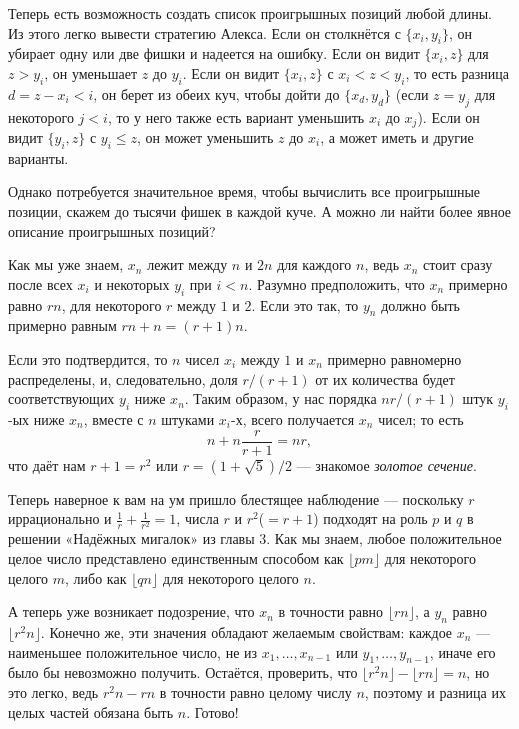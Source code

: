 Теперь есть возможность создать список проигрышных позиций любой длины.
Из этого легко вывести стратегию Алекса.
Если он столкнётся с $\{x_i , y_i\}$, он убирает одну или две фишки и надеется на ошибку.
Если он видит $\{x_i , z\}$ для $z > y_i$, он уменьшает $z$ до $y_i$.
Если он видит $\{x_i , z\}$ с $x_i < z < y_i$, то есть разница $d = z - x_i < i$, он берет из обеих куч, чтобы дойти до $\{x_d , y_d\}$ (если $z = y_j$ для некоторого $j < i$, то у него также есть вариант уменьшить $x_i$ до $x_j$).
Если он видит $\{y_i , z\}$ с $y_i \le z$, он может уменьшить $z$ до $x_i$, а может иметь и другие варианты.

Однако потребуется значительное время, чтобы вычислить все проигрышные позиции, скажем до тысячи фишек в каждой куче.
А можно ли найти более явное описание проигрышных позиций?

Как мы уже знаем, $x_n$ лежит между $n$ и $2n$ для каждого $n$, ведь $x_n$ стоит сразу после всех $x_i$ и некоторых $y_i$ при $i < n$.
Разумно предположить, что $x_n$ примерно равно $rn$, для некоторого $r$ между $1$ и $2$.
Если это так, то $y_n$ должно быть примерно равным $rn + n = (r + 1)n$.

Если это подтвердится, то $n$ чисел $x_i$ между $1$ и $x_n$ примерно равномерно распределены, и, следовательно, доля $r/(r + 1)$ от их количества будет соответствующих $y_i$ ниже $x_n$.
Таким образом, у нас порядка $nr/(r + 1)$ штук $y_i$-ых ниже $x_n$,
вместе с $n$ штуками $x_i$-х, всего получается $x_n$ чисел; то есть
\[n+n\frac{r}{r+1}=nr,\]
что даёт нам $r + 1 = r^2$ или $r = (1 + \sqrt{5})/2$ --- знакомое \emph{золотое сечение}.

Теперь наверное к вам на ум пришло блестящее наблюдение --- поскольку $r$ иррационально и $\tfrac1r+\tfrac1{r^2}=1$, числа $r$ и $r^2$($= r + 1$) подходят на роль $p$ и $q$ в решении «Надёжных мигалок» из главы 3.
Как мы знаем, любое положительное целое число представлено единственным способом как $\lfloor pm\rfloor$ для некоторого целого $m$, либо как $\lfloor qn\rfloor$ для некоторого целого $n$.

А теперь уже возникает подозрение, что $x_n$ в точности равно $\lfloor rn\rfloor$, а $y_n$ равно $\lfloor r^2 n\rfloor$.
Конечно же, эти значения обладают желаемым свойствам:
каждое $x_n$ --- наименьшее положительное число, не из $x_1, \dots , x_{n-1}$ или $y_1, \dots, y_{n-1}$, иначе его было бы невозможно получить.
Остаётся, проверить, что $\lfloor r^2 n\rfloor - \lfloor rn\rfloor = n$, но это легко, ведь $r^2 n - rn$ в точности равно целому числу $n$,
поэтому и разница их целых частей обязана быть $n$.
Готово!

